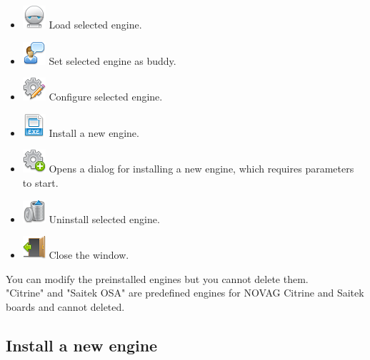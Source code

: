 \documentclass[11pt,a4paper]{article}
\begin{document}
	\begin{itemize}
		\item \includegraphics[scale=0.5]{robot.png} Load selected engine.
		\item \includegraphics[scale=0.5]{user_comment.png} Set selected engine as buddy.
		\item \includegraphics[scale=0.5]{cog_edit.png} Configure selected engine.
		\item \includegraphics[scale=0.5]{file_extension_exe.png} Install a new engine.
		\item \includegraphics[scale=0.5]{cog_add.png} Opens a dialog for installing a new engine, which requires parameters to start.
		\item \includegraphics[scale=0.5]{bin.png} Uninstall selected engine.
		\item \includegraphics[scale=0.5]{door_out.png} Close the window.
	\end{itemize}
	You can modify the preinstalled engines but you cannot delete them.\\
	"Citrine" and "Saitek OSA" are predefined engines for NOVAG Citrine and Saitek boards and cannot deleted.\\
	
	\subsection{Install a new engine} \label{InstallEngine}
	
\end{document}
